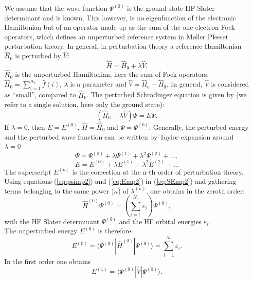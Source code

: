 \documentclass[11pt,DIV=13,BCOR=5mm,a4paper,headinclude]{scrbook}
\begin{document}
We assume that the wave function $\Psi^{(0)}$ is the ground state HF Slater determinant and is known.
This however, is no eigenfunction of the electronic Hamiltonian but of an operator made up as the sum of the one-electron Fock operators, which defines an unperturbed reference system in M\o{}ller Plesset perturbation theory.
In general, in perturbation theory a reference Hamiltonian $\hat{H}_0$ is perturbed by $\hat{V}$:
\begin{equation}
 \hat{H} = \hat{H}_0 + \lambda \hat{V}.
\end{equation}
$\hat{H}_0$ is the unperturbed Hamiltonian, here the sum of Fock operators, $\hat{H}_0=\sum_{i=1}^{N_e}\hat{f}(i)$, $\lambda$ is a parameter and $\hat{V}=\hat{H}_e - \hat{H}_0$.
In general, $\hat{V}$ is considered as ``small'', compared to $\hat{H}_0$.
The perturbed Schrödinger equation is given by (we refer to a single solution, here only the ground state):
\begin{equation}\label{eq:SEmp2}
 (\hat{H}_0 + \lambda \hat{V})\Psi = E\Psi.
\end{equation}
If $\lambda=0$, then $E=E^{(0)}$, $\hat{H} = \hat{H}_0$ and $\Psi=\Psi^{(0)}$.
Generally, the perturbed energy and the perturbed wave function can be written by Taylor expansion around $\lambda=0$
\begin{equation}\label{eq:psimp2}
 \Psi = \Psi^{(0)} + \lambda \Psi^{(1)} + \lambda^2\Psi^{(2)} + ...,
\end{equation}
\begin{equation}\label{eq:Emp2}
 E = E^{(0)} + \lambda E^{(1)} + \lambda^2E^{(2)} + ...
\end{equation}
The superscript $E^{(n)}$ is the correction at the n-th order of perturbation theory.\\
Using equations (\ref{eq:psimp2}) and (\ref{eq:Emp2}) in (\ref{eq:SEmp2}) and gathering terms belonging to the same power ($n$) of $\lambda^{(n)}$, one obtains in the zeroth order:
\begin{equation}
 \hat{H}^{(0)}\Psi^{(0)}=(\sum_{i=1}^{N_e} \varepsilon_i)\Psi^{(0)},
\end{equation}
with the HF Slater determinant $\Psi^{(0)}$ and the HF orbital energies $\varepsilon_i$.\\
The unperturbed energy $E^{(0)}$ is therefore:
\begin{equation}
 E^{(0)} = \langle\Psi^{(0)}|\hat{H}^{(0)}|\Psi^{(0)}\rangle=\sum\limits_{i=1}^{N_e}\varepsilon_i.
\end{equation}
In the first order one obtains
\begin{equation}
 E^{(1)} = \langle\Psi^{(0)}|\hat{V}|\Psi^{(0)}\rangle.
\end{equation}
\end{document}
